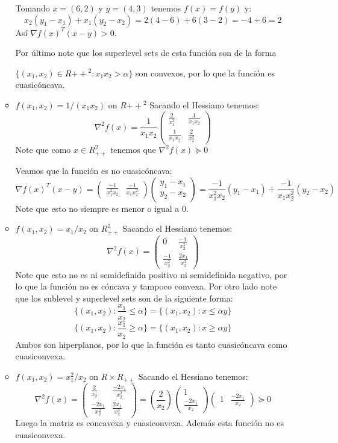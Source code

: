 \documentclass[12pt, oneside]{article}%
\begin{document}
\begin{enumerate}
\begin{itemize}
    Tomando $x=(6,2)$ y $y=(4,3)$ tenemos $f(x) = f(y)$ y: 
    $$x_2(y_1-x_1) + x_1(y_2-x_2) = 2(4-6) + 6(3-2)= -4 + 6 = 2$$ 
    Así $\nabla f(x)^T(x-y) > 0$. 
    
    Por último note que los superlevel sets de esta función son de la forma 
    
    $\{ (x_1,x_2) \in R{++}^2 : x_1x_2 > \alpha \}$ son convexos, por lo que la función es cuasicóncava.
    
    \item $f(x_1,x_2) = 1/(x_1x_2)$ on $R{++}^2$
    Sacando el Hessiano tenemos:
    $$ \nabla^2 f(x) = \frac{1}{x_1x_2} \begin{pmatrix} \frac{2}{x_1^2} &  \frac{1}{x_1x_2} \\ \frac{1}{x_1x_2} &  \frac{2}{x_2^2} \end{pmatrix}$$
    Note que como $x \in R_{++}^2$ tenemos que $\nabla^2 f(x) \succeq 0 $
    
    Veamos que la función es no cuasicóncava: 
    $$\nabla f(x)^T(x-y) = \begin{pmatrix} \frac{-1}{x_1^2x_2} & \frac{-1}{x_1x_2^2} \end{pmatrix} \begin{pmatrix} y_1 - x_1 \\ y_2 - x_2 \end{pmatrix} = \frac{-1}{x_1^2x_2} (y_1 - x_1)  + \frac{-1}{x_1x_2^2} (y_2 - x_2)$$ 
    Note que esto no siempre es menor o igual a 0. 
    
    \item $f(x_1,x_2) = x_1/x_2$ on $R_{++}^2$
    Sacando el Hessiano tenemos:
    $$ \nabla^2 f(x) = \begin{pmatrix} 0 &  \frac{-1}{x_2^2} \\ \frac{-1}{x_2^2} &  \frac{2x_1}{x_2^3} \end{pmatrix} $$ Note que esto no es ni semidefinida positivo ni semidefinida negativo, por lo que la función no es cóncava y tampoco convexa. 
    Por otro lado note que los sublevel y superlevel sets son de la siguiente forma: 
    $$\{(x_1,x_2): \frac{x_1}{x_2} \leq \alpha\} = \{(x_1,x_2): x \leq \alpha y\}$$
    $$\{(x_1,x_2): \frac{x_1}{x_2} \geq \alpha\} = \{(x_1,x_2): x \geq \alpha y\}$$
    Ambos son hiperplanos, por lo que la función es tanto cuasicóncava como cuasiconvexa. 
    
    \item $f(x_1,x_2) = x_1^2/x_2$ on $R \times R_{++}$
    Sacando el Hessiano tenemos:
    $$ \nabla^2 f(x) = \begin{pmatrix} \frac{2}{x_2} & \frac{-2x_1}{x_2^2} \\\frac{-2x_1}{x_2^2} & \frac{2x_1}{x_2^3} \end{pmatrix} = \left(\frac{2}{x_2}\right) \begin{pmatrix} 1 \\ \frac{-2x_1}{x_2} \end{pmatrix} \begin{pmatrix} 1 &  \frac{-2x_1}{x_2} \end{pmatrix} \succeq 0$$
    Luego la matriz es concavexa y cuasiconvexa. Además esta función no es cuasiconvexa. 
   

\end{itemize}
\end{enumerate}
\end{document}
